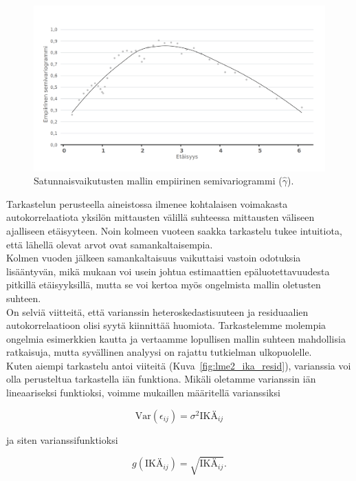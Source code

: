 \documentclass[finnish]{docopts}
\begin{document}
\begin{figure}[H]
\centering
  \includegraphics[scale=0.8]{kuvaajat/lme2_vario.png}
  \caption{Satunnaisvaikutusten mallin empiirinen semivariogrammi ($\hat{\gamma}$).}
  \label{fig:lme2_vario}
\end{figure}

Tarkastelun perusteella aineistossa ilmenee kohtalaisen voimakasta autokorrelaatiota yksilön mittausten välillä suhteessa mittausten väliseen ajalliseen etäisyyteen. Noin kolmeen vuoteen saakka tarkastelu tukee intuitiota, että lähellä olevat arvot ovat samankaltaisempia.\\

Kolmen vuoden jälkeen samankaltaisuus vaikuttaisi vastoin odotuksia lisääntyvän, mikä \cite{pinheiro00} mukaan voi usein johtua estimaattien epäluotettavuudesta pitkillä etäisyyksillä, mutta se voi kertoa myös ongelmista mallin oletusten suhteen.\\

On selviä viitteitä, että varianssin heteroskedastisuuteen ja residuaalien autokorrelaatioon olisi syytä kiinnittää huomiota. Tarkastelemme molempia ongelmia esimerkkien kautta ja vertaamme lopullisen mallin suhteen mahdollisia ratkaisuja, mutta syvällinen analyysi on rajattu tutkielman ulkopuolelle.\\

Kuten aiempi tarkastelu antoi viiteitä (Kuva~\ref{fig:lme2_ika_resid}), varianssia voi olla perusteltua tarkastella iän funktiona. Mikäli oletamme varianssin iän lineaariseksi funktioksi, voimme \cite{pinheiro00} mukaillen määritellä varianssiksi

$$
\text{Var}(\epsilon_{ij}) = \sigma^2\text{IKÄ}_{ij}
$$

ja siten varianssifunktioksi

$$
g(\text{IKÄ}_{ij}) = \sqrt{\text{IKÄ}_{ij}}.
$$
\end{document}
